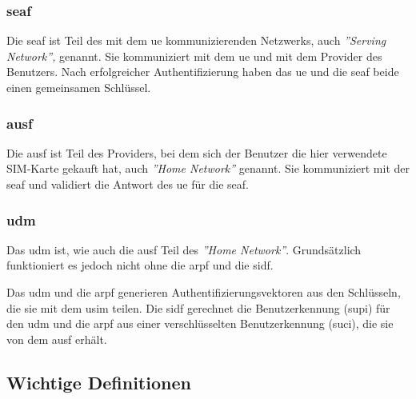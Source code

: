 \subsubsection{\gls{seaf}}

Die \gls{seaf} ist Teil des mit dem \gls{ue} kommunizierenden Netzwerks, auch \textit{''Serving Network''‚} genannt.
Sie kommuniziert mit dem \gls{ue} und mit dem Provider des Benutzers.
Nach erfolgreicher Authentifizierung haben das \gls{ue} und die \gls{seaf} beide einen gemeinsamen Schl\"ussel.%

\subsubsection{\gls{ausf}}

Die \gls{ausf} ist Teil des Providers, bei dem sich der Benutzer die hier verwendete SIM-Karte gekauft hat, auch \textit{''Home Network''} genannt.
Sie kommuniziert mit der \gls{seaf} und validiert die Antwort des \gls{ue} f\"ur die \gls{seaf}.

\subsubsection{\gls{udm}}

Das \gls{udm} ist, wie auch die \gls{ausf} Teil des \textit{''Home Network''}.
Grunds\"atzlich funktioniert es jedoch nicht ohne die \gls{arpf} und die \gls{sidf}.

Das \gls{udm} und die \gls{arpf} generieren Authentifizierungsvektoren aus den Schl\"usseln, die sie mit dem \gls{usim} teilen.
Die \gls{sidf} gerechnet die Benutzerkennung (\gls{supi}) f\"ur den \gls{udm} und die \gls{arpf} aus einer verschl\"usselten Benutzerkennung (\gls{suci}), die sie von dem \gls{ausf} erh\"alt.


\subsection{Wichtige Definitionen}

